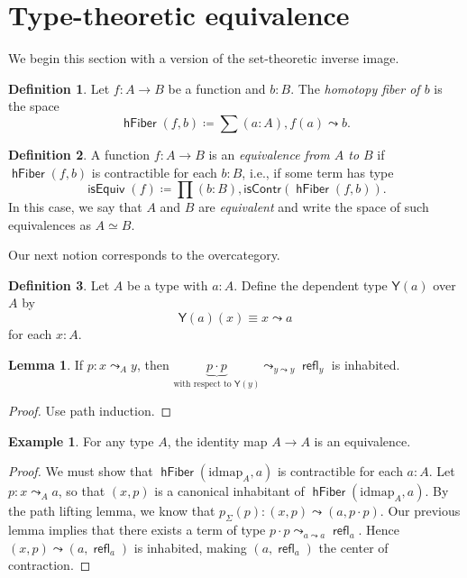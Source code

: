 \documentclass[10pt,letterpaper,cm]{nupset}
\theoremstyle{definition}
\newtheorem*{definition}{Definition}
\newtheorem{exmp}{Example}
\newtheorem{lemma}{Lemma}
\newcommand{\1}{\mathbf{1}}
\newcommand{\0}{\vec 0}
\DeclareMathOperator{\refl}{\mathsf{refl}}
\DeclareMathOperator{\hfiber}{\mathsf{hFiber}}
\DeclareMathOperator{\isequiv}{\mathsf{isEquiv}}
\begin{document}
\section{Type-theoretic equivalence}

We begin this section with a version of the set-theoretic inverse image.

\begin{definition}
Let $f: A \to B$ be a function and $b: B$. The \textit{homotopy fiber of $b$} is the space $$\hfiber(f,b) \coloneqq \sum(a:A), f(a) \leadsto b .$$
\end{definition}

\begin{definition}
A function $f: A \to B$ is an \textit{equivalence from $A$ to $B$} if $\hfiber(f,b)$ is contractible for each $b: B$, i.e., if some term has type $$\isequiv(f) \coloneqq \prod(b: B),\mathsf{isContr}(\hfiber(f,b)).$$ In this case, we say that $A$ and $B$ are \textit{equivalent} and write the space of such equivalences as $A \simeq B$.
\end{definition}

Our next notion corresponds to the overcategory.

\begin{definition}
Let $A$ be a type with $a:A$. Define the dependent type $\mathsf{Y}(a)$ over $A$ by $$ \mathsf{Y}(a) (x) \equiv x \leadsto a $$ for each $x: A$. 
\end{definition}

\begin{lemma}
If $p: x \leadsto_A y$, then $\underbrace{p \cdot p}_{\text{with respect to } \mathsf{Y}(y)} \leadsto_{y \leadsto y} \refl_y$ is inhabited.
\end{lemma}
\begin{proof}
Use path induction.
\end{proof}

\begin{exmp}
For any type $A$, the identity map $A \to A$ is an equivalence.
\end{exmp}
\begin{proof}
We must show that $\hfiber(\text{idmap}_A, a)$ is contractible for each $a: A$. Let $p: x \leadsto_A a$, so that $(x,p)$ is a canonical inhabitant of  $\hfiber(\text{idmap}_A, a)$. By the path lifting lemma, we know that $p_{\Sigma}(p) : (x,p)  \leadsto (a, p \cdot p)$. Our previous lemma implies that there exists a term of type $p \cdot p \leadsto_{a\leadsto a} \refl_a$. Hence $(x, p)\leadsto (a, \refl_a)$ is inhabited, making $(a, \refl_a)$ the center of contraction.
\end{proof}
\end{document}
